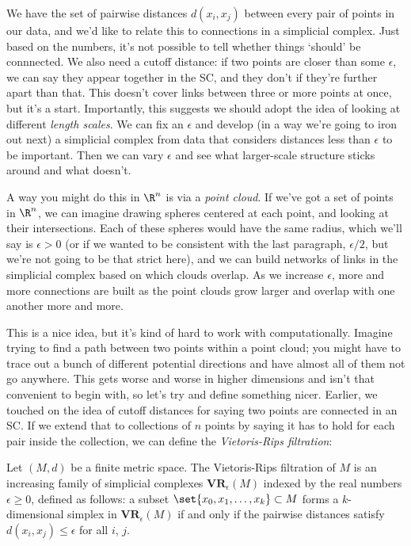 \documentclass{lec}
\begin{document}
    We have the set of pairwise distances $d(x_i, x_j)$ between every pair of points in our data, and we'd like to relate this to connections in a simplicial complex. Just based on the numbers, it's not possible to tell whether things `should' be connnected. We also need a cutoff distance: if two points are closer than some $\epsilon$, we can say they appear together in the SC, and they don't if they're further apart than that. This doesn't cover links between three or more points at once, but it's a start. Importantly, this suggests we should adopt the idea of looking at different \textit{length scales}. We can fix an $\epsilon$ and develop (in a way we're going to iron out next) a simplicial complex from data that considers distances less than $\epsilon$ to be important. Then we can vary $\epsilon$ and see what larger-scale structure sticks around and what doesn't.

    A way you might do this in $\R^n$ is via a \textit{point cloud}. If we've got a set of points in $\R^n$, we can imagine drawing spheres centered at each point, and looking at their intersections. Each of these spheres would have the same radius, which we'll say is $\epsilon > 0$ (or if we wanted to be consistent with the last paragraph, $\epsilon/2$, but we're not going to be that strict here), and we can build networks of links in the simplicial complex based on which clouds overlap. As we increase $\epsilon$, more and more connections are built as the point clouds grow larger and overlap with one another more and more.

    This is a nice idea, but it's kind of hard to work with computationally. Imagine trying to find a path between two points within a point cloud; you might have to trace out a bunch of different potential directions and have almost all of them not go anywhere. This gets worse and worse in higher dimensions and isn't that convenient to begin with, so let's try and define something nicer. Earlier, we touched on the idea of cutoff distances for saying two points are connected in an SC. If we extend that to collections of $n$ points by saying it has to hold for each pair inside the collection, we can define the \textit{Vietoris-Rips filtration}:

    \begin{definition}
        Let $(M, d)$ be a finite metric space. The Vietoris-Rips filtration of $M$ is an
        increasing family of simplicial complexes $\mathbf{VR}_\epsilon(M)$ indexed by the real numbers $\epsilon \geq 0$, defined as follows: a subset $\set{x_0, x_1, \dots, x_k}\subset M$ forms a $k$-dimensional simplex in $\mathbf{VR}_\epsilon(M)$ if and only if the pairwise distances satisfy $d(x_i, x_j) \leq \epsilon$ for all $i$, $j$.
    \end{definition}
\end{document}
